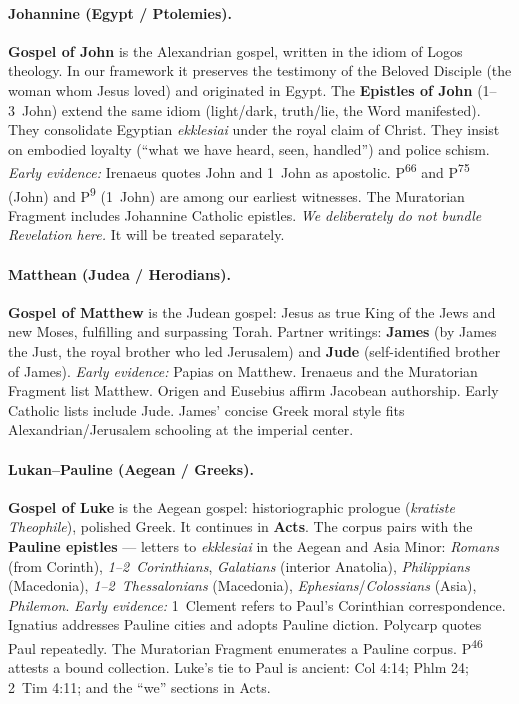 \paragraph{Johannine (Egypt / Ptolemies).}
\textbf{Gospel of John} is the Alexandrian gospel, written in the idiom of Logos theology.
In our framework it preserves the testimony of the Beloved Disciple (the woman whom Jesus loved) and originated in Egypt.
The \textbf{Epistles of John} (1–3~John) extend the same idiom (light/dark, truth/lie, the Word manifested).
They consolidate Egyptian \textit{ekklesiai} under the royal claim of Christ.
They insist on embodied loyalty (“what we have heard, seen, handled”) and police schism.
\emph{Early evidence:} Irenaeus quotes John and 1~John as apostolic.
P\textsuperscript{66} and P\textsuperscript{75} (John) and P\textsuperscript{9} (1~John) are among our earliest witnesses.
The Muratorian Fragment includes Johannine Catholic epistles.
\emph{We deliberately do not bundle Revelation here.}
It will be treated separately.

\paragraph{Matthean (Judea / Herodians).}
\textbf{Gospel of Matthew} is the Judean gospel: Jesus as true King of the Jews and new Moses, fulfilling and surpassing Torah.
Partner writings: \textbf{James} (by James the Just, the royal brother who led Jerusalem) and \textbf{Jude} (self-identified brother of James).
\emph{Early evidence:} Papias on Matthew.
Irenaeus and the Muratorian Fragment list Matthew.
Origen and Eusebius affirm Jacobean authorship.
Early Catholic lists include Jude.
James’ concise Greek moral style fits Alexandrian/Jerusalem schooling at the imperial center.

\paragraph{Lukan–Pauline (Aegean / Greeks).}
\textbf{Gospel of Luke} is the Aegean gospel: historiographic prologue (\textit{kratiste Theophile}), polished Greek.
It continues in \textbf{Acts}.
The corpus pairs with the \textbf{Pauline epistles} — letters to \textit{ekklesiai} in the Aegean and Asia Minor: \textit{Romans} (from Corinth), \textit{1–2~Corinthians}, \textit{Galatians} (interior Anatolia), \textit{Philippians} (Macedonia), \textit{1–2~Thessalonians} (Macedonia), \textit{Ephesians}/\textit{Colossians} (Asia), \textit{Philemon}.
\emph{Early evidence:} 1~Clement refers to Paul’s Corinthian correspondence.
Ignatius addresses Pauline cities and adopts Pauline diction.
Polycarp quotes Paul repeatedly.
The Muratorian Fragment enumerates a Pauline corpus.
P\textsuperscript{46} attests a bound collection.
Luke’s tie to Paul is ancient: Col 4:14; Phlm 24; 2~Tim 4:11; and the “we” sections in Acts.

